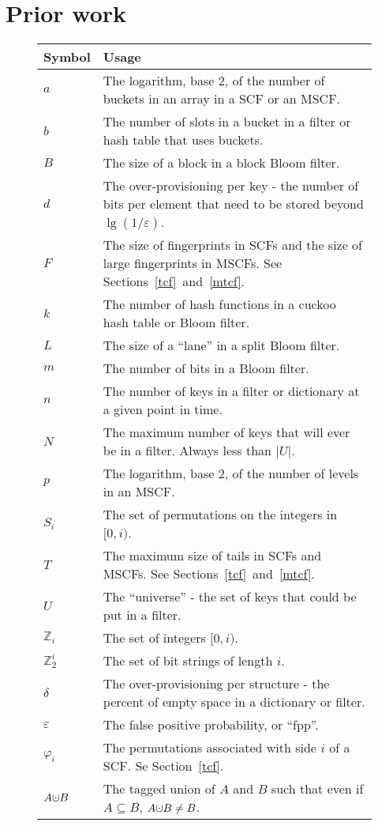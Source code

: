 \documentclass[letterpaper,twocolumn,10pt]{article}
\newcommand{\ints}{\mathbb{Z}}
\newcommand{\dotcup}{\ensuremath{\mathaccent\cdot\cup}}
\newcommand{\TCF}{SCF}
\newcommand{\MTCF}{MSCF}
\newcommand{\TCF}{TCF}
\newcommand{\MTCF}{MTCF}
\begin{document}

\section{Prior work}

\begin{figure}[t!]
\begin{tabular}{|m{0.5in}|m{2.5in}|}
\hline {\bf Symbol} & {\bf Usage} \\
\hline $a$ & The logarithm, base 2, of the number of buckets in an array in a \TCF{} or an \MTCF{}. \\
\hline $b$ & The number of slots in a bucket in a filter or hash table that uses buckets. \\
\hline $B$ & The size of a block in a block Bloom filter. \\
\hline $d$ & The over-provisioning per key - the number of bits per element that need to be stored beyond $\lg (1/\varepsilon)$. \\
\hline $F$ & The size of fingerprints in \TCF{}s and the size of large fingerprints in \MTCF{}s.
See Sections~\ref{tcf}~and~\ref{mtcf}. \\
\hline $k$ & The number of hash functions in a cuckoo hash table or Bloom filter. \\
\hline $L$ & The size of a ``lane'' in a split Bloom filter. \\
\hline $m$ & The number of bits in a Bloom filter. \\
\hline $n$ & The number of keys in a filter or dictionary at a given point in time. \\
\hline $N$ & The maximum number of keys that will ever be in a filter.
Always less than $|U|$. \\
\hline $p$ & The logarithm, base 2, of the number of levels in an \MTCF{}. \\
\hline $S_i$ & The set of permutations on the integers in $[0, i)$. \\
\hline $T$ & The maximum size of tails in \TCF{}s and \MTCF{}s.
See Sections~\ref{tcf}~and~\ref{mtcf}. \\
\hline $U$ & The ``universe'' - the set of keys that could be put in a filter. \\
\hline $\ints_i$ & The set of integers $[0, i)$. \\
\hline $\ints_2^i$ & The set of bit strings of length $i$. \\
\hline $\delta$ & The over-provisioning per structure - the percent of empty space in a dictionary or filter. \\
\hline $\varepsilon$ & The false positive probability, or ``fpp''. \\
\hline $\varphi_i$ & The permutations associated with side $i$ of a \TCF{}.
Se Section~\ref{tcf}. \\
\hline $A \dotcup B$ & The tagged union of $A$ and $B$ such that even if $A \subseteq B$, $A \dotcup B \ne B$. \\
\hline
\end{tabular}
\end{figure}
\end{document}
